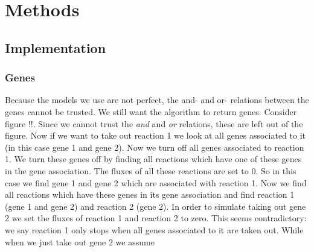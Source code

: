 \documentclass[12pt]{report}
\begin{document}
\section{Methods}
\subsection{Implementation}
\subsubsection{Genes}
Because the models we use are not perfect, the and- and or- relations between the genes cannot be trusted.
We still want the algorithm to return genes. Consider figure !!. Since we cannot trust the \emph{and} and \emph{or} relations, these are left out of the figure. Now if we want to take out reaction 1 we look at all genes associated to it (in this case gene 1 and gene 2). Now we turn off all genes associated to reaction 1. We turn these genes off by finding all reactions which have one of these genes in the gene association. The fluxes of all these reactions are set to 0. So in this case we find gene 1 and gene 2 which are associated with reaction 1. Now we find all reactions which have these genes in its gene association and find reaction 1 (gene 1 and gene 2) and reaction 2 (gene 2). In order to simulate taking out gene 2 we set the fluxes of reaction 1 and reaction 2 to zero. This seems contradictory: we say reaction 1 only stops when all genes associated to it are taken out. While when we just take out gene 2 we assume  
\end{document}
